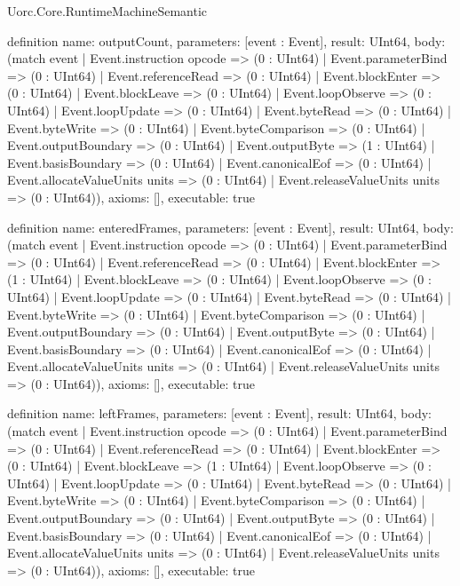 \begin{lexlean}{Uorc.Core.RuntimeMachineSemantic}
\begin{semanticmodule}
definition{
  name: outputCount,
  parameters: [event : Event],
  result: UInt64,
  body: (match event
    | Event.instruction opcode => (0 : UInt64)
    | Event.parameterBind => (0 : UInt64)
    | Event.referenceRead => (0 : UInt64)
    | Event.blockEnter => (0 : UInt64)
    | Event.blockLeave => (0 : UInt64)
    | Event.loopObserve => (0 : UInt64)
    | Event.loopUpdate => (0 : UInt64)
    | Event.byteRead => (0 : UInt64)
    | Event.byteWrite => (0 : UInt64)
    | Event.byteComparison => (0 : UInt64)
    | Event.outputBoundary => (0 : UInt64)
    | Event.outputByte => (1 : UInt64)
    | Event.basisBoundary => (0 : UInt64)
    | Event.canonicalEof => (0 : UInt64)
    | Event.allocateValueUnits units => (0 : UInt64)
    | Event.releaseValueUnits units => (0 : UInt64)),
  axioms: [],
  executable: true
}

definition{
  name: enteredFrames,
  parameters: [event : Event],
  result: UInt64,
  body: (match event
    | Event.instruction opcode => (0 : UInt64)
    | Event.parameterBind => (0 : UInt64)
    | Event.referenceRead => (0 : UInt64)
    | Event.blockEnter => (1 : UInt64)
    | Event.blockLeave => (0 : UInt64)
    | Event.loopObserve => (0 : UInt64)
    | Event.loopUpdate => (0 : UInt64)
    | Event.byteRead => (0 : UInt64)
    | Event.byteWrite => (0 : UInt64)
    | Event.byteComparison => (0 : UInt64)
    | Event.outputBoundary => (0 : UInt64)
    | Event.outputByte => (0 : UInt64)
    | Event.basisBoundary => (0 : UInt64)
    | Event.canonicalEof => (0 : UInt64)
    | Event.allocateValueUnits units => (0 : UInt64)
    | Event.releaseValueUnits units => (0 : UInt64)),
  axioms: [],
  executable: true
}

definition{
  name: leftFrames,
  parameters: [event : Event],
  result: UInt64,
  body: (match event
    | Event.instruction opcode => (0 : UInt64)
    | Event.parameterBind => (0 : UInt64)
    | Event.referenceRead => (0 : UInt64)
    | Event.blockEnter => (0 : UInt64)
    | Event.blockLeave => (1 : UInt64)
    | Event.loopObserve => (0 : UInt64)
    | Event.loopUpdate => (0 : UInt64)
    | Event.byteRead => (0 : UInt64)
    | Event.byteWrite => (0 : UInt64)
    | Event.byteComparison => (0 : UInt64)
    | Event.outputBoundary => (0 : UInt64)
    | Event.outputByte => (0 : UInt64)
    | Event.basisBoundary => (0 : UInt64)
    | Event.canonicalEof => (0 : UInt64)
    | Event.allocateValueUnits units => (0 : UInt64)
    | Event.releaseValueUnits units => (0 : UInt64)),
  axioms: [],
  executable: true
}


\end{semanticmodule}
\end{lexlean}
